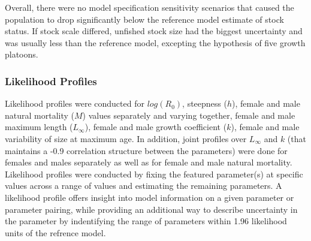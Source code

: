 \documentclass[11pt,
  english,
  a4paper,
]{article}
\begin{document}
Overall, there were no model specification sensitivity scenarios that caused the population to drop significantly below the reference model estimate of stock status. If stock scale differed, unfished stock size had the biggest uncertainty and was usually less than the reference model, excepting the hypothesis of five growth platoons.

\leavevmode\tagmcend\tagstructend\par


\hypertarget{likelihood-profiles}{%
\subsubsection{Likelihood Profiles}\label{likelihood-profiles}}

\leavevmode\tagmcend\tagstructend


Likelihood profiles were conducted for {\(log(R_0)\)\leavevmode\tagmcend\tagstructend}, steepness ({\(h\)\leavevmode\tagmcend\tagstructend}), female and male natural mortality ({\(M\)\leavevmode\tagmcend\tagstructend}) values separately and varying together, female and male maximum length ({\(L_{\infty}\)\leavevmode\tagmcend\tagstructend}), female and male growth coefficient ({\(k\)\leavevmode\tagmcend\tagstructend}), female and male variability of size at maximum age. In addition, joint profiles over {\(L_{\infty}\)\leavevmode\tagmcend\tagstructend} and {\(k\)\leavevmode\tagmcend\tagstructend} (that maintains a -0.9 correlation structure between the parameters) were done for females and males separately as well as for female and male natural mortality. Likelihood profiles were conducted by fixing the featured parameter(s) at specific values across a range of values and estimating the remaining parameters. A likelihood profile offers insight into model information on a given parameter or parameter pairing, while providing an additional way to describe uncertainty in the parameter by indentifying the range of parameters within 1.96 likelihood units of the refrence model.
\end{document}
